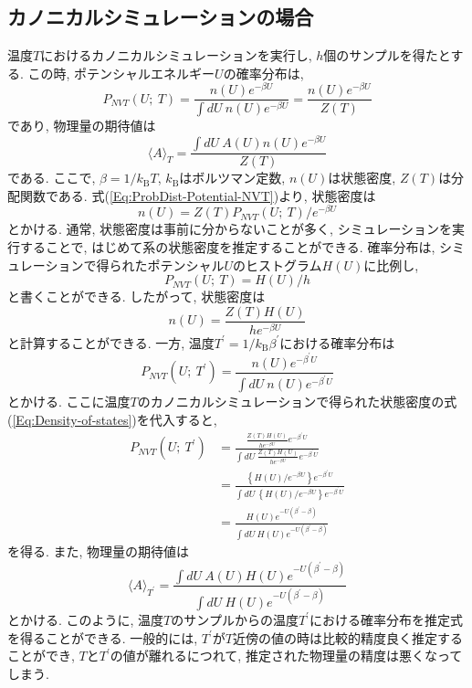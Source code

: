 \subsection{カノニカルシミュレーションの場合}
温度$T$におけるカノニカルシミュレーションを実行し, $h$個のサンプルを得たとする. 
この時, ポテンシャルエネルギー$U$の確率分布は, 
\begin{equation}
    P_{NVT}(U;~T) = \frac{n(U)e^{-\beta U}}{\int dU~ n(U)e^{-\beta U}} = \frac{n(U)e^{-\beta U}}{Z(T)}
    \label{Eq:ProbDist-Potential-NVT}
\end{equation}
であり, 物理量の期待値は
\begin{equation}
    \langle A \rangle_{T} = \frac{\int dU~A(U)n(U)e^{-\beta U}}{Z(T)}
\end{equation}
である. ここで, $\beta = 1/k_{\mathrm{B}}T$, $k_{\mathrm{B}}$はボルツマン定数, $n(U)$は状態密度, $Z(T)$は分配関数である. 
式(\ref{Eq:ProbDist-Potential-NVT})より, 状態密度は
\begin{equation}
    n(U) = Z(T) P_{NVT}(U;~T) / e^{-\beta U}
\end{equation}
とかける. 通常, 状態密度は事前に分からないことが多く, シミュレーションを実行することで, はじめて系の状態密度を推定することができる. 
確率分布は, シミュレーションで得られたポテンシャル$U$のヒストグラム$H(U)$に比例し, 
\begin{equation}
    P_{NVT}(U;~T)= H(U)/h
\end{equation}
と書くことができる. したがって, 状態密度は
\begin{equation}
    n(U) = \frac{Z(T) H(U)}{he^{-\beta U}}
    \label{Eq:Density-of-states}
\end{equation}
と計算することができる. 
一方, 温度$T^{\prime}=1/k_{\mathrm{B}}\beta^{\prime}$における確率分布は
\begin{equation}
    P_{NVT}(U;~T^{\prime}) =
    \frac{n(U)e^{-\beta^{\prime} U}}{\int dU~ n(U)e^{-\beta^{\prime} U}}
\end{equation}
とかける. ここに温度$T$のカノニカルシミュレーションで得られた状態密度の式(\ref{Eq:Density-of-states})を代入すると, 
\begin{align}
    P_{NVT}(U;~T^{\prime}) &=
    \frac{\frac{Z(T) H(U)}{he^{-\beta U}} e^{-\beta^{\prime} U}}{\int dU~ \frac{Z(T) H(U)}{he^{-\beta U}}e^{-\beta^{\prime} U}} \\ &=
    \frac{\left\{H(U)/e^{-\beta U}\right\} e^{-\beta^{\prime} U}}{\int dU~ \left\{H(U)/e^{-\beta U}\right\}e^{-\beta^{\prime} U}} \\ &=
    \frac{H(U) e^{-U(\beta^{\prime} -\beta)}}{\int dU~ H(U) e^{-U(\beta^{\prime} -\beta)}}
\end{align}
を得る. また, 物理量の期待値は
\begin{equation}
    \langle A \rangle_{T^{\prime}} = \frac{\int dU~ A(U) H(U) e^{-U(\beta^{\prime} -\beta)}}{\int dU~ H(U) e^{-U(\beta^{\prime} -\beta)}}
\end{equation}
とかける. 
このように, 温度$T$のサンプルからの温度$T^{\prime}$における確率分布を推定式を得ることができる. 
一般的には, $T^{\prime}$が$T$近傍の値の時は比較的精度良く推定することができ, $T$と$T^{\prime}$の値が離れるにつれて, 推定された物理量の精度は悪くなってしまう. 


